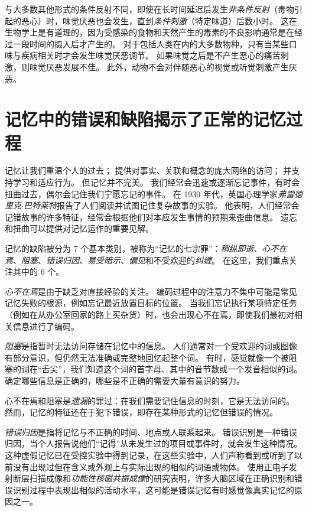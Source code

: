 与大多数其他形式的条件反射不同，即使在长时间延迟后发生\textit{非条件反射}（毒物引起的恶心）时，味觉厌恶也会发生，直到\textit{条件刺激}（特定味道）后数小时。
这在生物学上是有道理的，因为受感染的食物和天然产生的毒素的不良影响通常是在经过一段时间的摄入后才产生的。
对于包括人类在内的大多数物种，只有当某些口味与疾病相关时才会发生味觉厌恶调节。
如果味觉之后是不产生恶心的痛苦刺激，则味觉厌恶发展不佳。
此外，动物不会对伴随恶心的视觉或听觉刺激产生厌恶。



\section{记忆中的错误和缺陷揭示了正常的记忆过程}

记忆让我们重温个人的过去； 提供对事实、关联和概念的庞大网络的访问；
并支持学习和适应行为。
但记忆并不完美。
我们经常会迅速或逐渐忘记事件，有时会扭曲过去，偶尔会记住我们宁愿忘记的事件。
在 1930 年代，英国心理学家\textit{弗雷德里克$\cdot$巴特莱特}报告了人们阅读并试图记住复杂故事的实验。
他表明，人们经常会记错故事的许多特征，经常会根据他们对本应发生事情的预期来歪曲信息。
遗忘和扭曲可以提供对记忆运作的重要见解。


记忆的缺陷被分为 7 个基本类别，被称为“记忆的七宗罪”：\textit{稍纵即逝}、\textit{心不在焉}、\textit{阻塞}、\textit{错误归因}、\textit{易受暗示}、\textit{偏见}和不受欢迎的\textit{纠缠}。
在这里，我们重点关注其中的 6 个。


\textit{心不在焉}是由于缺乏对直接经验的关注。
编码过程中的注意力不集中可能是常见记忆失败的根源，例如忘记最近放置目标的位置。
当我们忘记执行某项特定任务（例如在从办公室回家的路上买杂货）时，也会出现心不在焉，即使我们最初对相关信息进行了编码。


\textit{阻塞}是指暂时无法访问存储在记忆中的信息。
人们通常对一个受欢迎的词或图像有部分意识，但仍然无法准确或完整地回忆起整个词。
有时，感觉就像一个被阻塞的词在“舌尖”，我们知道这个词的首字母、其中的音节数或一个发音相似的词。
确定哪些信息是正确的，哪些是不正确的需要大量有意识的努力。


心不在焉和阻塞是\textit{遗漏}的罪过：在我们需要记住信息的时刻，它是无法访问的。
然而，记忆的特征还在于犯下错误，即存在某种形式的记忆但错误的情况。


\textit{错误归因}是指将记忆与不正确的时间、地点或人联系起来。
错误识别是一种错误归因，当个人报告说他们“记得”从未发生过的项目或事件时，就会发生这种情况。
这种虚假记忆已在受控实验中得到记录，在这些实验中，人们声称看到或听到了以前没有出现过但在含义或外观上与实际出现的相似的词语或物体。
使用正电子发射断层扫描成像和\textit{功能性核磁共振成像}的研究表明，许多大脑区域在正确识别和错误识别过程中表现出相似的活动水平，这可能是错误记忆有时感觉像真实记忆的原因之一。


